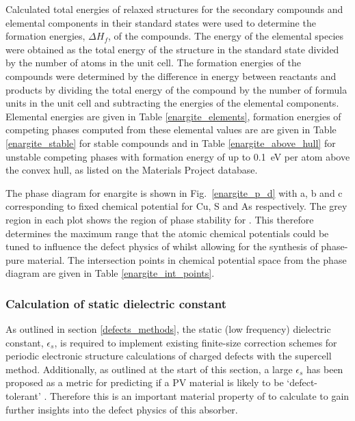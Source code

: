 \documentclass[11pt, twoside]{report}
\begin{document}
Calculated total energies of relaxed structures for the secondary compounds and elemental components in their standard states were used to determine the formation energies, $\Delta H_f$, of the compounds.
The energy of the elemental species were obtained as the total energy of the structure in the standard state divided by the number of atoms in the unit cell. The formation energies of the compounds were determined by the difference in energy between reactants and products by dividing the total energy of the compound by the number of formula units in the unit cell and subtracting the energies of the elemental components.
Elemental energies are given in Table \ref{enargite_elements}, formation energies of competing phases computed from these elemental values are are given in Table \ref{enargite_stable} for stable compounds and in Table \ref{enargite_above_hull} for unstable competing phases with formation energy of up to \SI{0.1}{eV} per atom above the convex hull, as listed on the Materials Project database.

The phase diagram for enargite is shown in Fig.~\ref{enargite_p_d} with a, b and c corresponding to fixed chemical potential for Cu, S and As respectively. The grey region in each plot shows the region of phase stability for {\enargite}. This therefore determines the maximum range that the atomic chemical potentials could be tuned to influence the defect physics of {\enargite} whilst allowing for the synthesis of phase-pure material. The intersection points in chemical potential space from the {\enargite} phase diagram are given in Table \ref{enargite_int_points}.



\subsubsection{Calculation of static dielectric constant}

As outlined in section \ref{defects_methods}, the static (low frequency) dielectric constant, $\epsilon_s$, is required to implement existing finite-size correction schemes for periodic electronic structure calculations of charged defects with the supercell method. Additionally, as outlined at the start of this section, a large $\epsilon_s$ has been proposed as a metric for predicting if a PV material is likely to be `defect-tolerant' \cite{MIT_defect_tolerance}. Therefore this is an important material property of {\enargite} to calculate to gain further insights into the defect physics of this absorber.
\end{document}
